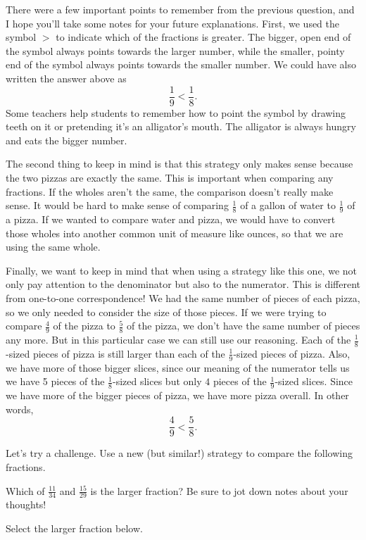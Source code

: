 \documentclass{ximera}
\begin{document}
There were a few important points to remember from the previous question, and I hope you'll take some notes for your future explanations. First, we used the symbol $>$ to indicate which of the fractions is greater. The bigger, open end of the symbol always points towards the larger number, while the smaller, pointy end of the symbol always points towards the smaller number. We could have also written the answer above as
\[
\frac{1}{9} < \frac{1}{8}.
\]
Some teachers help students to remember how to point the symbol by drawing teeth on it or pretending it's an alligator's mouth. The alligator is always hungry and eats the bigger number.

The second thing to keep in mind is that this strategy only makes sense because the two pizzas are exactly the same. This is important when comparing any fractions. If the wholes aren't the same, the comparison doesn't really make sense. It would be hard to make sense of comparing $\frac{1}{8}$ of a gallon of water to $\frac{1}{9}$ of a pizza. If we wanted to compare water and pizza, we would have to convert those wholes into another common unit of measure like ounces, so that  we are using the same whole. 

Finally, we want to keep in mind that when using a strategy like this one, we not only pay attention to the denominator but also to the numerator. This is different from one-to-one correspondence! We had the same number of pieces of each pizza, so we only needed to consider the size of those pieces. If we were trying to compare $\frac{4}{9}$ of the pizza to $\frac{5}{8}$ of the pizza, we don't have the same number of pieces any more. But in this particular case we can still use our reasoning. Each of the $\frac{1}{8}$-sized pieces of pizza is still larger than each of the $\frac{1}{9}$-sized pieces of pizza. Also, we have more of those bigger slices, since our meaning of the numerator tells us we have 5 pieces of the $\frac{1}{8}$-sized slices  but only $4$ pieces of the $\frac{1}{9}$-sized slices. Since we have more of the bigger pieces of pizza, we have more pizza overall. In other words, 
\[
\frac{4}{9} < \frac{5}{8}.
\]

Let's try a challenge. Use a new (but similar!) strategy to compare the following fractions.

\begin{question}
Which of $\frac{11}{34}$ and $\frac{15}{29}$ is the larger fraction? Be sure to jot down notes about your thoughts!

Select the larger fraction below.
\begin{multipleChoice}
\end{multipleChoice}
\end{question}
\end{document}
